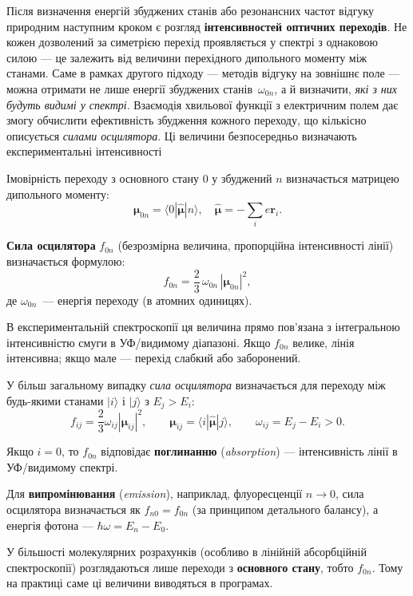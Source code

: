 
Після визначення енергій збуджених станів або резонансних частот відгуку
природним наступним кроком є розгляд \textbf{інтенсивностей оптичних переходів}.
Не кожен дозволений за симетрією перехід проявляється у спектрі з однаковою силою ---
це залежить від величини перехідного дипольного моменту між станами.
Саме в рамках другого підходу --- методів відгуку на зовнішнє поле ---
можна отримати не лише енергії збуджених станів~$\omega_{0n}$,
а й визначити, \emph{які з них будуть видимі у спектрі}.
Взаємодія хвильової функції з електричним полем дає змогу обчислити
ефективність збудження кожного переходу,
що кількісно описується \emph{силами осцилятора}.
Ці величини безпосередньо визначають експериментальні інтенсивності



Імовірність переходу з основного стану $0$ у збуджений $n$ визначається
матрицею дипольного моменту:
\[
    \boldsymbol{\mu}_{0n} = \langle 0 | \hat{\boldsymbol{\mu}} | n \rangle,
    \quad
    \hat{\boldsymbol{\mu}} = -\sum_i e \mathbf{r}_i.
\]

\textbf{Сила осцилятора} $f_{0n}$ (безрозмірна величина, пропорційна інтенсивності лінії)
визначається формулою:
\[
    f_{0n} = \frac{2}{3}\,\omega_{0n}\,|\boldsymbol{\mu}_{0n}|^2,
\]
де $\omega_{0n}$~--- енергія переходу (в атомних одиницях).

В експериментальній спектроскопії ця величина прямо пов’язана з інтегральною
інтенсивністю смуги в УФ/видимому діапазоні. Якщо $f_{0n}$ велике, лінія інтенсивна; якщо мале --- перехід слабкий або заборонений.

\begin{commentbox}
    У більш загальному випадку \emph{сила осцилятора} визначається
    для переходу між будь-якими станами $|i\rangle$ і $|j\rangle$ з $E_j > E_i$:
    \[
        f_{ij} = \frac{2}{3} \omega_{ij} |\boldsymbol{\mu}_{ij}|^2,
        \qquad
        \boldsymbol{\mu}_{ij} = \langle i | \hat{\boldsymbol{\mu}} | j \rangle,
        \qquad
        \omega_{ij} = E_j - E_i > 0.
    \]

    Якщо $i=0$, то $f_{0n}$ відповідає \textbf{поглинанню} (\emph{absorption}) ---
    інтенсивність лінії в УФ/видимому спектрі.

    Для \textbf{випромінювання} (\emph{emission}), наприклад, флуоресценції $n \to 0$,
    сила осцилятора визначається як $f_{n0} = f_{0n}$ (за принципом детального балансу),
    а енергія фотона --- $\hbar\omega = E_n - E_0$.

    У більшості молекулярних розрахунків (особливо в лінійній абсорбційній спектроскопії)
    розглядаються лише переходи з \textbf{основного стану}, тобто $f_{0n}$.
    Тому на практиці саме ці величини виводяться в програмах.
\end{commentbox}

